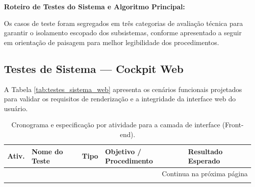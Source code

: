 \noindent\textbf{Roteiro de Testes do Sistema e Algoritmo Principal:}

Os casos de teste foram segregados em três categorias de avaliação técnica para garantir o isolamento escopado dos subsistemas, conforme apresentado a seguir em orientação de paisagem para melhor legibilidade dos procedimentos.

\begin{landscape}

\subsection*{Testes de Sistema — Cockpit Web}
A Tabela \ref{tab:testes_sistema_web} apresenta os cenários funcionais projetados para validar os requisitos de renderização e a integridade da interface web do usuário.

\begin{center}
\begin{longtable}{|c|p{4.5cm}|c|p{8cm}|p{6cm}|}
\caption{Cronograma e especificação por atividade para a camada de interface (Front-end).} \label{tab:justificativas_atraso} \\
\hline
\textbf{Ativ.} & \textbf{Nome do Teste} & \textbf{Tipo} & \textbf{Objetivo / Procedimento} & \textbf{Resultado Esperado} \\ \hline
\endhead
\hline \multicolumn{5}{|r|}{{Continua na próxima página}} \\ \hline
\endfoot
\hline \hline
\endlastfoot


\end{longtable}
\end{center}
\end{landscape}
